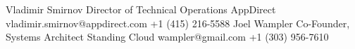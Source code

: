 
\begin{referees}
		{Vladimir Smirnov}
		{Director of Technical Operations}
		{AppDirect}
		{vladimir.smirnov@appdirect.com}
    {+1 (415) 216-5588}
		{Joel Wampler}
		{Co-Founder, Systems Architect}
		{Standing Cloud}
		{wampler@gmail.com}
    {+1 (303) 956-7610}
\end{referees}
